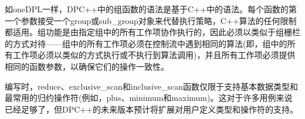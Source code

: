 如oneDPL一样，DPC++中的组函数的语法是基于C++中的语法。每个函数的第一个参数接受一个group或sub\_group对象来代替执行策略，C++算法的任何限制都适用。组功能是由指定组中的所有工作项协作执行的，因此必须以类似于组栅栏的方式对待——组中的所有工作项必须在控制流中遇到相同的算法(即，组中的所有工作项必须以类似的方式执行或不执行到算法调用)，并且所有工作项必须提供相同的函数参数，以确保它们的操作一致性。\par

编写时，reduce、exclusive\_scan和inclusive\_scan函数仅限于支持基本数据类型和最常用的归约操作符(例如，plus、minimum和maximum)。这对于许多用例来说已经足够了，但DPC++的未来版本预计将扩展对用户定义类型和操作符的支持。\par

